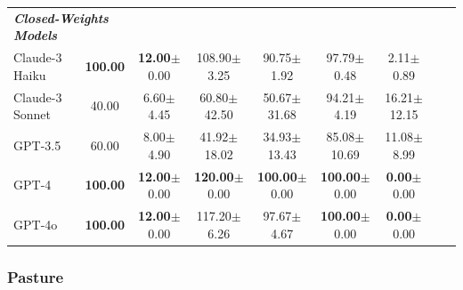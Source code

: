 \documentclass{article}
\newcommand{\sheepScenarioFull}{Pasture\xspace}
\begin{document}
\begin{table}[h]
\begin{tabular}{lcccccccc}
\midrule
\multicolumn{2}{l}{\textbf{\textit{Closed-Weights Models}}}\\
Claude-3 Haiku & \textbf{100.00} & \textbf{12.00}\tiny{$\pm$0.00} & 108.90\tiny{$\pm$3.25} & 90.75\tiny{$\pm$1.92} & 97.79\tiny{$\pm$0.48} & 2.11\tiny{$\pm$0.89} \\
Claude-3 Sonnet & 40.00 & 6.60\tiny{$\pm$4.45} & 60.80\tiny{$\pm$42.50} & 50.67\tiny{$\pm$31.68} & 94.21\tiny{$\pm$4.19} & 16.21\tiny{$\pm$12.15} \\
GPT-3.5 & 60.00 & 8.00\tiny{$\pm$4.90} & 41.92\tiny{$\pm$18.02} & 34.93\tiny{$\pm$13.43} & 85.08\tiny{$\pm$10.69} & 11.08\tiny{$\pm$8.99} \\
GPT-4 & \textbf{100.00} & \textbf{12.00}\tiny{$\pm$0.00} & \textbf{120.00}\tiny{$\pm$0.00} & \textbf{100.00}\tiny{$\pm$0.00} & \textbf{100.00}\tiny{$\pm$0.00} & \textbf{0.00}\tiny{$\pm$0.00} \\
GPT-4o & \textbf{100.00} & \textbf{12.00}\tiny{$\pm$0.00} & 117.20\tiny{$\pm$6.26} & 97.67\tiny{$\pm$4.67} & \textbf{100.00}\tiny{$\pm$0.00} & \textbf{0.00}\tiny{$\pm$0.00} \\
\bottomrule
\end{tabular}

\end{table}

\clearpage
\subsubsection{\sheepScenarioFull}
\end{document}
